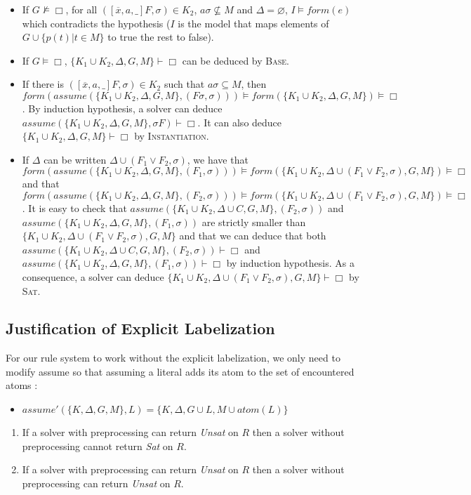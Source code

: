 \documentclass[a4paper,10pt]{report}
\newcommand{\atom}{\mathit{atom}}
\newcommand{\F}{\mathit{form}}
\newcommand{\A}{\mathit{assume}}
\begin{document}
\begin{itemize}
 \item If $G\nvDash\Box$, for all $([\overline x,a,\_]F,\sigma)\in K_2$, $a\sigma\nsubseteq M$ and
$\Delta=\varnothing$, $I\vDash\F(e)$ which contradicts the hypothesis ($I$ is the model that
maps elements of $G\cup\{p(t)|t\in M\}$ to true the rest to false).
 \item If $G\vDash\Box$, $\{K_1\cup K_2,\Delta,G,M\}\vdash\Box$ can be deduced by \textsc{Base}.
 \item If there is $([\overline x,a,\_]F,\sigma)\in K_2$ such that $a\sigma\subseteq M$, then
$\F(\A(\{K_1\cup K_2,\Delta,G,M\},(F\sigma,\sigma)))\vDash\F(\{K_1\cup K_2,\Delta,G,M\})\vDash\Box$.
By induction hypothesis,
a solver can deduce $\A(\{K_1\cup K_2,\Delta,G,M\},\sigma F)\vdash\Box$.
It can also deduce $\{K_1\cup K_2,\Delta,G,M\}\vdash\Box$ by \textsc{Instantiation}.
 \item If $\Delta$ can be written $\Delta\cup(F_1\vee F_2,\sigma)$,
we have that $\F(\A(\{K_1\cup K_2,\Delta,G,M\},(F_1,\sigma)))\vDash
\F(\{K_1\cup K_2,\Delta\cup(F_1\vee F_2,\sigma),G,M\})\vDash\Box$
and that $\F(\A(\{K_1\cup K_2,\Delta,G,M\},(F_2,\sigma)))\vDash
\F(\{K_1\cup K_2,\Delta\cup(F_1\vee F_2,\sigma),G,M\})\vDash\Box$.
It is easy to check that $\A(\{K_1\cup K_2,\Delta\cup C,G,M\},(F_2,\sigma))$ and
$\A(\{K_1\cup K_2,\Delta,G,M\}, (F_1,\sigma))$ are strictly smaller than
$\{K_1\cup K_2,\Delta\cup (F_1\vee F_2,\sigma),G,M\}$
and that we can deduce that both
$\A(\{K_1\cup K_2,\Delta\cup C,G,M\},(F_2,\sigma))\vdash\Box$ and
$\A(\{K_1\cup K_2,\Delta,G,M\},(F_1,\sigma))\vdash\Box$ by induction hypothesis.
As a consequence, a solver can deduce $\{K_1\cup K_2,\Delta\cup(F_1\vee F_2,\sigma),G,M\}\vdash\Box$ by \textsc{Sat}.
\end{itemize}

\subsection{Justification of Explicit Labelization}
For our rule system to work without the explicit labelization, we only need to modify assume so that
assuming a literal adds its atom to the set of encountered atoms :
\begin{itemize}
 \item $\A'(\{K,\Delta,G,M\},L) = \{K,\Delta,G\cup L, M\cup\atom(L)\}$
\end{itemize}

\begin{enumerate}
 \item If a solver with preprocessing can return \emph{Unsat} on $R$ then a solver without
preprocessing cannot return \emph{Sat} on $R$.
 \item If a solver with preprocessing can return \emph{Unsat} on $R$ then a solver without
preprocessing can return \emph{Unsat} on $R$.
\end{enumerate}
\end{document}
